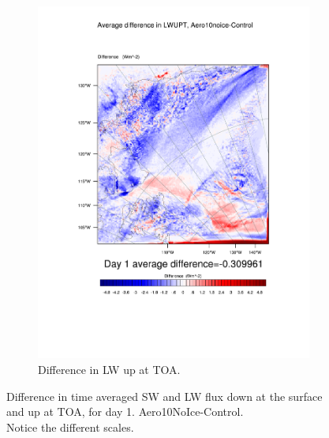 \begin{figure}
\begin{subfigure}{0.48\textwidth}
		\includegraphics[width=\textwidth]{results/aero10ni/diff_Aero10NoIce_LWUPT_Day1.pdf}
		\caption{Difference in LW up at TOA.}
		\label{subfig:lwup_r4Day1}
	\end{subfigure}
	\caption{Difference in time averaged SW and LW flux down at the surface and up at TOA, for day 1. Aero10NoIce-Control.\\Notice the different scales.}
	\label{fig:radiation_r4Day1}
\end{figure}

